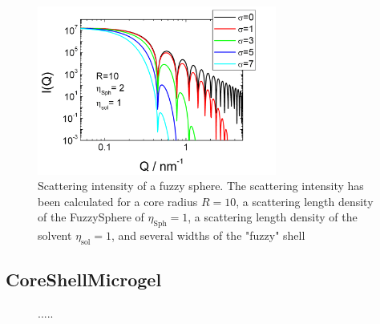\begin{figure}[htb]
\begin{center}
\includegraphics[width=0.7\textwidth,height=0.5\textwidth]{../images/form_factor/FuzzySphere/FuzzySphereIQ.png}
\end{center}
\caption{Scattering intensity of a fuzzy sphere. The scattering
intensity has been calculated for a core radius $R=10$, a
scattering length density of the FuzzySphere of
$\eta_\text{Sph}=1$, a scattering length density of the solvent
$\eta_\text{sol}=1$, and several widths of the "fuzzy" shell}
\label{fig:I_FuzzySphere}
\end{figure}


\clearpage
\subsection{CoreShellMicrogel}
\label{sect:CoreShellMicrogel}

\begin{figure}[htb]
\begin{center}
\hfill
{}
\end{center}
\caption{.....}
\label{fig:profile:CoreShellMicrogel}
\end{figure}



